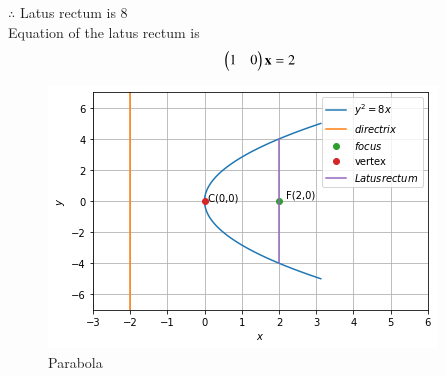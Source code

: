 \documentclass[journal,12pt,twocolumn]{IEEEtran}
\begin{document}
$\therefore$ Latus rectum is 8\\
Equation of the latus rectum is
\begin{align}
    \begin{pmatrix}1&0\end{pmatrix}\mathbf{x}=2
\end{align}
\begin{figure}[ht]
    \centering
    \includegraphics[width=\columnwidth]{parabola.png}
    \caption{Parabola}
    \label{Graphical solution}
\end{figure}
\end{document}
